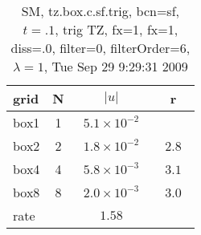 \begin{table}[hbt]\tableFont %
\begin{center}
\begin{tabular}{|l|c|c|c|} \hline 
grid  & N &  $\vert u \vert$   & r \\ \hline 
                box1 &     1 & ~$5.1\times10^{ -2}$~ &            \\ \hline
                box2 &     2 & ~$1.8\times10^{ -2}$~ & ~$  2.8$~  \\ \hline
                box4 &     4 & ~$5.8\times10^{ -3}$~ & ~$  3.1$~  \\ \hline
                box8 &     8 & ~$2.0\times10^{ -3}$~ & ~$  3.0$~  \\ \hline
    rate             &       &       $1.58$         &        \\ \hline
\end{tabular}
\caption{SM, tz.box.c.sf.trig, bcn=sf, $t=.1$, trig TZ, fx=1, fx=1, diss=.0, filter=0, filterOrder=6, $\lambda=1$, Tue Sep 29  9:29:31 2009}\label{table:tz.box.c.sf.trig}
\end{center}
\end{table}
